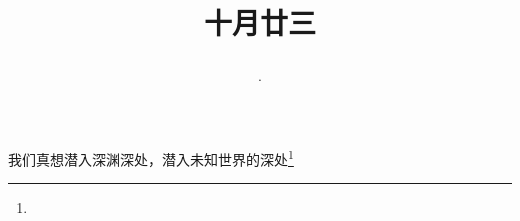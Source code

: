 \title{\date[d=23,m=11,y=2024][year:cn-y,年,month:cn,day:cn,日,·,weekday]·十月廿三 }
我们真想潜入深渊深处，潜入未知世界的深处\footnote{ }

